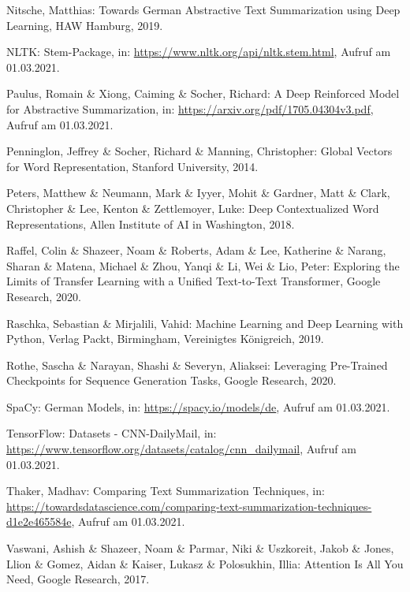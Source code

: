\begin{thebibliography}{50}
Nitsche, Matthias: Towards German Abstractive Text Summarization using Deep Learning, HAW Hamburg, 2019.

NLTK: Stem-Package, in: \url{https://www.nltk.org/api/nltk.stem.html}, Aufruf am 01.03.2021.

Paulus, Romain \& Xiong, Caiming \& Socher, Richard: A Deep Reinforced Model for Abstractive Summarization, in: \url{https://arxiv.org/pdf/1705.04304v3.pdf}, Aufruf am 01.03.2021.

Penninglon, Jeffrey \& Socher, Richard \& Manning, Christopher: Global Vectors for Word Representation, Stanford University, 2014.

Peters, Matthew \& Neumann, Mark \& Iyyer, Mohit \& Gardner, Matt \& Clark, Christopher \& Lee, Kenton \& Zettlemoyer, Luke: Deep Contextualized Word Representations, Allen Institute of AI in Washington, 2018.

Raffel, Colin \& Shazeer, Noam \& Roberts, Adam \& Lee, Katherine \& Narang, Sharan \& Matena, Michael \& Zhou, Yanqi \& Li, Wei \& Lio, Peter: Exploring the Limits of Transfer Learning with a Unified Text-to-Text Transformer, Google Research, 2020.

Raschka, Sebastian \& Mirjalili, Vahid: Machine Learning and Deep Learning with Python, Verlag Packt, Birmingham, Vereinigtes Königreich, 2019.

Rothe, Sascha \& Narayan, Shashi \& Severyn, Aliaksei: Leveraging Pre-Trained Checkpoints for Sequence Generation Tasks, Google Research, 2020.

SpaCy: German Models, in: \url{https://spacy.io/models/de}, Aufruf am 01.03.2021.

TensorFlow: Datasets - CNN-DailyMail, in: \url{https://www.tensorflow.org/datasets/catalog/cnn_dailymail}, Aufruf am 01.03.2021.

Thaker, Madhav: Comparing Text Summarization Techniques, in: \url{https://towardsdatascience.com/comparing-text-summarization-techniques-d1e2e465584e}, Aufruf am 01.03.2021.

Vaswani, Ashish \& Shazeer, Noam \& Parmar, Niki \& Uszkoreit, Jakob \& Jones, Llion \& Gomez, Aidan \& Kaiser, Lukasz \& Polosukhin, Illia: Attention Is All You Need, Google Research, 2017.


\end{thebibliography}
